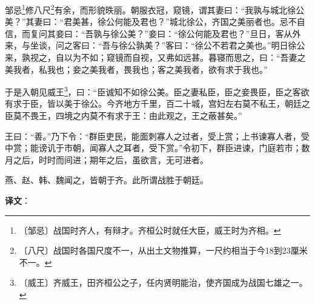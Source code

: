\documentclass[12pt,UTF-8,openany,a4]{ctexbook}
\begin{document}
\begin{large}
    
    邹忌\footnote{〔邹忌〕\yiwen 战国时齐人，有辩才。齐桓公时就任大臣，威王时为齐相。}修八尺\footnote{〔八尺〕\yiwen 战国时各国尺度不一，从出土文物推算，一尺约相当于今18到23厘米不一。}有余，而形貌昳丽。朝服衣冠，窥镜，谓其妻曰：“我孰与城北徐公美？”其妻曰：“君美甚，徐公何能及君也？”城北徐公，齐国之美丽者也。忌不自信，而复问其妾曰：“吾孰与徐公美？”妾曰：“徐公何能及君也？”旦日，客从外来，与坐谈，问之客曰：“吾与徐公孰美？”客曰：“徐公不若君之美也。”明日徐公来，孰视之，自以为不如；窥镜而自视，又弗如远甚。暮寝而思之，曰：“吾妻之美我者，私我也；妾之美我者，畏我也；客之美我者，欲有求于我也。”
    
    于是入朝见威王\footnote{〔威王〕\yiwen 齐威王，田齐桓公之子，任内贤明能治，使齐国成为战国七雄之一。}，曰：“臣诚知不如徐公美。臣之妻私臣，臣之妾畏臣，臣之客欲有求于臣，皆以美于徐公。今齐地方千里，百二十城，宫妇左右莫不私王，朝廷之臣莫不畏王，四境之内莫不有求于王：由此观之，王之蔽甚矣。”
    
    王曰：“善。”乃下令：“群臣吏民，能面刺寡人之过者，受上赏；上书谏寡人者，受中赏；能谤讥于市朝，闻寡人之耳者，受下赏。”令初下，群臣进谏，门庭若市；数月之后，时时而间进；期年之后，虽欲言，无可进者。
    
    燕、赵、韩、魏闻之，皆朝于齐。此所谓战胜于朝廷。

\end{large}


\newpage

\begin{Large}
   \noindent \textbf{译文}：
\end{Large}

\vspace{1em}
\end{document}
